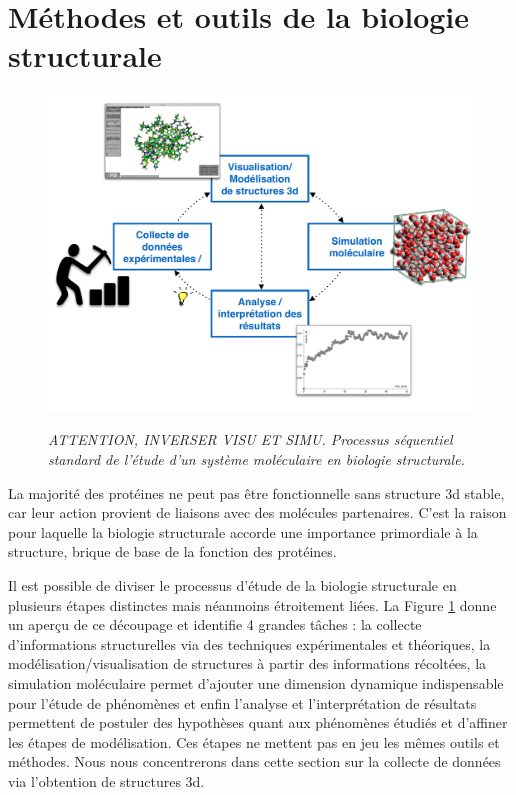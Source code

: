 \section{Méthodes et outils de la biologie structurale}

\begin{figure}[h]
  \centering
  {\includegraphics[width=.75\linewidth]{./figures/ch1/structural_biology_process}}
    \caption{{\it ATTENTION, INVERSER VISU ET SIMU.
    Processus séquentiel standard de l'étude d'un système moléculaire en biologie structurale.}}
  \label{Fig:schema_seq_bio_struct}
  \hspace{0.2cm}
\end{figure}

La majorité des protéines ne peut pas être fonctionnelle sans structure 3d stable, car leur action provient de liaisons avec des molécules partenaires. C'est la raison pour laquelle la biologie structurale accorde une importance primordiale à la structure, brique de base de la fonction des protéines.

Il est possible de diviser le processus d'étude de la biologie structurale en plusieurs étapes distinctes mais néanmoins étroitement liées. La Figure \ref{Fig:schema_seq_bio_struct} donne un aperçu de ce découpage et identifie 4 grandes tâches : la collecte d'informations structurelles via des techniques expérimentales et théoriques, la modélisation/visualisation de structures à partir des informations récoltées, la simulation moléculaire permet d'ajouter une dimension dynamique indispensable pour l'étude de phénomènes et enfin l'analyse et l'interprétation de résultats permettent de postuler des hypothèses quant aux phénomènes étudiés et d'affiner les étapes de modélisation.
Ces étapes ne mettent pas en jeu les mêmes outils et méthodes. Nous nous concentrerons dans cette section sur la collecte de données via l'obtention de structures 3d.


